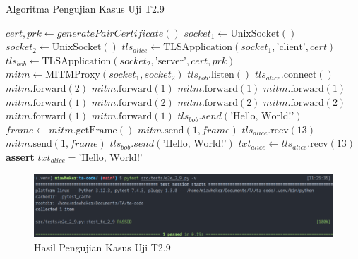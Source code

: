\begin{algorithm}
  \caption{Algoritma Pengujian Kasus Uji T2.9}
  \label{alg:unit.test.t2.9}
  \begin{algorithmic}
    \State $cert, prk \gets generatePairCertificate()$
    \State $socket_1 \gets \text{UnixSocket}()$
    \State $socket_2 \gets \text{UnixSocket}()$
    \State $tls_{alice} \gets \text{TLSApplication}(socket_1, \text{'client'}, cert)$ 
    \State $tls_{bob} \gets \text{TLSApplication}(socket_2, \text{'server'}, cert, prk)$
    \State $mitm \gets \text{MITMProxy}(socket_1, socket_2)$
    \State
    \State $tls_{bob}.\text{listen}()$  
    \State $tls_{alice}.\text{connect}()$  
    \State
    \State $mitm.\text{forward}(2)$ 
    \State $mitm.\text{forward}(1)$ 
    \State $mitm.\text{forward}(1)$ 
    \State $mitm.\text{forward}(1)$ 
    \State $mitm.\text{forward}(1)$ 
    \State $mitm.\text{forward}(2)$ 
    \State $mitm.\text{forward}(2)$ 
    \State $mitm.\text{forward}(2)$ 
    \State $mitm.\text{forward}(1)$ 
    \State $mitm.\text{forward}(1)$ 
    \State
    \State $tls_{bob}.send(\text{'Hello, World!'})$
    \State $frame \gets mitm.\text{getFrame}()$
    \State $mitm.\text{send}(1, frame)$
    \State
    \State $tls_{alice}.\text{recv}(13)$ 
    \State $mitm.\text{send}(1, frame)$ 
    \State 
    \State $tls_{bob}.send(\text{'Hello, World!'})$
    \State $txt_{alice} \gets tls_{alice}.\text{recv}(13)$
    \State \textbf{assert} $txt_{alice} = \text{'Hello, World!'}$
  \end{algorithmic}
\end{algorithm}

\begin{figure}[ht]
  \centering
  \includegraphics[width=\textwidth]{chapters/res/appendix-4/2.9.png}
  \caption{Hasil Pengujian Kasus Uji T2.9}
  \label{fig:unit.test.t2.9}
\end{figure}

